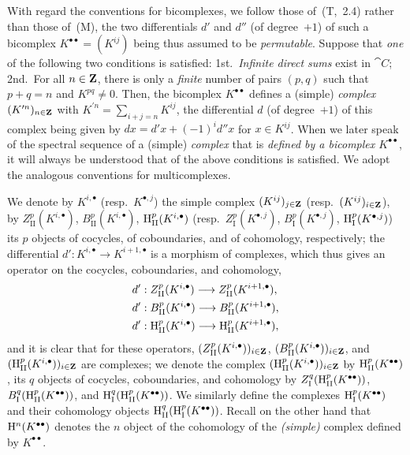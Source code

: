 \begin{env}[11.3.1]
\label{0.11.3.1}
With regard the conventions for bicomplexes, we follow those of~(T,~2.4) rather than those of~(M), the two differentials $d'$ and $d''$ (of degree~$+1$) of such a bicomplex $K^{\bullet\bullet}=(K^{ij})$ being thus assumed to be \emph{permutable}.
Suppose that \emph{one} of the following two conditions is satisfied: 1st.~\emph{Infinite direct sums} exist in $\cat{C}$; 2nd.~For all $n\in\mathbf{Z}$, there is only a \emph{finite} number of pairs $(p,q)$ such that $p+q=n$ and $K^{pq}\neq 0$.
Then, the bicomplex $K^{\bullet\bullet}$ defines a (simple) \emph{complex} $(K^{\prime n})_{n\in\mathbf{Z}}$ with $K^{\prime n}=\sum_{i+j=n}K^{ij}$, the differential $d$ (of degree~$+1$) of this complex being given by $dx=d'x+(-1)^i d''x$ for $x\in K^{ij}$.
When we later speak of the spectral sequence of a (simple) \emph{complex} that is \emph{defined by a bicomplex $K^{\bullet\bullet}$}, it will always be understood that of the above conditions is satisfied.
We adopt the analogous conventions for multicomplexes.

We denote by $K^{i,\bullet}$ (resp.~$K^{\bullet,j}$) the simple complex $(K^{ij})_{j\in\mathbf{Z}}$ (resp.~$(K^{ij})_{i\in\mathbf{Z}}$), by $Z_\text{II}^p(K^{i,\bullet})$, $B_\text{II}^p(K^{i,\bullet})$, $\mathrm{H}_\text{II}^p(K^{i,\bullet})$ (resp.~$Z_\text{I}^p(K^{\bullet,j})$, $B_\text{I}^p(K^{\bullet,j})$, $\mathrm{H}_\text{I}^p(K^{\bullet,j})$) its $p$ objects of cocycles, of coboundaries, and of cohomology, respectively; the differential $d':K^{i,\bullet}\to K^{i+1,\bullet}$ is a morphism of complexes, which thus gives an operator on the cocycles, coboundaries, and cohomology,
\begin{align*}
  d'&:Z_\text{II}^p(K^{i,\bullet})\to Z_\text{II}^p(K^{i+1,\bullet}),\\
  d'&:B_\text{II}^p(K^{i,\bullet})\to B_\text{II}^p(K^{i+1,\bullet}),\\
  d'&:\HH_\text{II}^p(K^{i,\bullet})\to\HH_\text{II}^p(K^{i+1,\bullet}),
\end{align*}
and it is clear that for these operators, $(Z_\text{II}^p(K^{i,\bullet}))_{i\in\mathbf{Z}}$, $(B_\text{II}^p(K^{i,\bullet}))_{i\in\mathbf{Z}}$, and $(\mathrm{H}_\text{II}^p(K^{i,\bullet}))_{i\in\mathbf{Z}}$ are complexes; we denote the complex $(\mathrm{H}_\text{II}^p(K^{i,\bullet}))_{i\in\mathbf{Z}}$ by $\mathrm{H}_\text{II}^p(K^{\bullet\bullet})$, its $q$ objects of cocycles, coboundaries, and cohomology by $Z_\text{I}^q(\mathrm{H}_\text{II}^p(K^{\bullet\bullet}))$, $B_\text{I}^q(\mathrm{H}_\text{II}^p(K^{\bullet\bullet}))$, and $\mathrm{H}_\text{I}^q(\mathrm{H}_\text{II}^p(K^{\bullet\bullet}))$.
We similarly define the complexes $\mathrm{H}_\text{I}^p(K^{\bullet\bullet})$ and their cohomology objects $\mathrm{H}_\text{II}^q(\mathrm{H}_\text{I}^p(K^{\bullet\bullet}))$.
Recall on the other hand that $\mathrm{H}^n(K^{\bullet\bullet})$ denotes the $n$ object of the cohomology of the \emph{(simple)} complex defined by $K^{\bullet\bullet}$.
\end{env}


